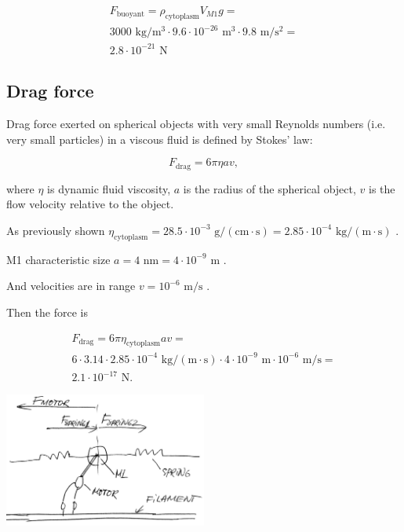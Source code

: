 \begin{equation}
\begin{split}
F_{\text{buoyant}} = \rho_{\text{cytoplasm}}V_{M1}g =\\
3000 \text{ kg}/\text{m}^3 \cdot 9.6 \cdot 10^{-26} \text{ m}^3 \cdot 9.8 \text{ m}/\text{s}^2 =\\
2.8 \cdot 10^{-21} \text{ N}
\end{split}
\end{equation}

\subsection{Drag force}

Drag force exerted on spherical objects with very small Reynolds numbers (i.e. very small particles) in a viscous fluid is defined by Stokes' law:

\begin{equation}
F_{\text{drag}} = 6\pi\eta av,
\end{equation}

where $\eta$ is dynamic fluid viscosity, $a$ is the radius of the spherical object, $v$ is the flow velocity relative to the object.

As previously shown $\eta_{\text{cytoplasm}} = 28.5 \cdot 10^{-3} \text{ g}/(\text{cm} \cdot \text{s}) = 2.85 \cdot 10^{-4} \text{ kg}/(\text{m} \cdot \text{s})$ \cite{swaminathan1997photobleaching, IAPWS2008}.

M1 characteristic size $a = 4 \text{ nm} = 4 \cdot 10^{-9} \text{ m}$ \cite{shtykova2013structural}.

And velocities are in range $v = 10^{-6} \text{ m/s}$ \cite{muller2008tug}.

Then the force is

\begin{equation}
\begin{split}
F_{\text{drag}} = 6\pi\eta_{\text{cytoplasm}} av = \\
6 \cdot 3.14 \cdot 2.85 \cdot 10^{-4} \text{ kg}/(\text{m} \cdot \text{s}) \cdot 4 \cdot 10^{-9} \text{ m} \cdot 10^{-6} \text{ m/s} =\\
2.1 \cdot 10^{-17} \text{ N}.
\end{split}
\end{equation}

\begin{center}
\includegraphics[width=0.5\textwidth]{D_chapters/1_TugOfWar/Capsid.jpg}
\end{center}


